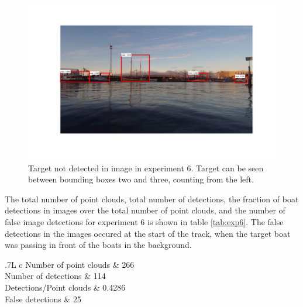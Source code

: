 \begin{figure}[H]
	\centering
	\includegraphics[width=\linewidth]{fig/ex6_miss.png}
	\caption{Target not detected in image in experiment 6. Target can be seen between bounding boxes two and three, counting from the left.}
	\label{fig:issues_ex6_2}
\end{figure}
The total number of point clouds, total number of detections, the fraction of boat detections in images over the total number of point clouds, and the number of false image detections for experiment 6 is shown in table \ref{tab:exp6}. The false detections in the images occured at the start of the track, when the target boat was passing in front of the boats in the background.
\begin{table}[!htb]
	\centering
	\begin{tabularx}{.7\linewidth}{L c}
		\toprule
		Number of point clouds & 266\\
		\midrule
		Number of detections & 114\\
		\midrule
		Detections/Point clouds & 0.4286 \\
		\midrule
		False detections & 25\\
		\bottomrule
	\end{tabularx}
	\caption{Data from experiment 6.}
	\label{tab:exp6}
\end{table}
